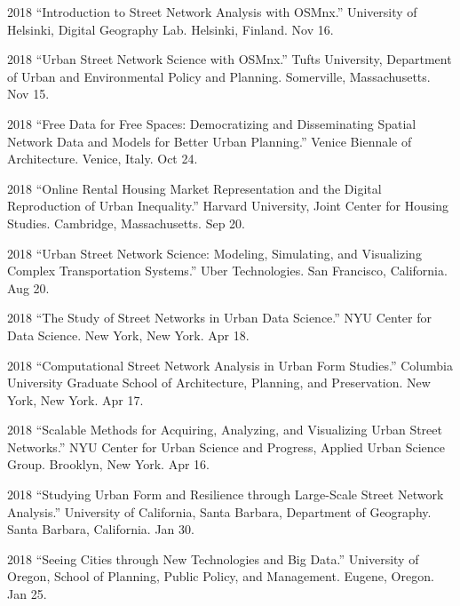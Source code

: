 \documentclass[11pt,letterpaper]{report}
\begin{document}
\begin{tablist}
        \item[2018] \tab{}\enquote{Introduction to Street Network Analysis with OSMnx.} University of Helsinki, Digital Geography Lab. Helsinki, Finland. Nov 16.

        \item[2018] \tab{}\enquote{Urban Street Network Science with OSMnx.} Tufts University, Department of Urban and Environmental Policy and Planning. Somerville, Massachusetts. Nov 15.

        \item[2018] \tab{}\enquote{Free Data for Free Spaces: Democratizing and Disseminating Spatial Network Data and Models for Better Urban Planning.} Venice Biennale of Architecture. Venice, Italy. Oct 24.

        \item[2018] \tab{}\enquote{Online Rental Housing Market Representation and the Digital Reproduction of Urban Inequality.} Harvard University, Joint Center for Housing Studies. Cambridge, Massachusetts. Sep 20.

        \item[2018] \tab{}\enquote{Urban Street Network Science: Modeling, Simulating, and Visualizing Complex Transportation Systems.} Uber Technologies. San Francisco, California. Aug 20.

        \item[2018] \tab{}\enquote{The Study of Street Networks in Urban Data Science.} NYU Center for Data Science. New York, New York. Apr 18.

        \item[2018] \tab{}\enquote{Computational Street Network Analysis in Urban Form Studies.} Columbia University Graduate School of Architecture, Planning, and Preservation. New York, New York. Apr 17.

        \item[2018] \tab{}\enquote{Scalable Methods for Acquiring, Analyzing, and Visualizing Urban Street Networks.} NYU Center for Urban Science and Progress, Applied Urban Science Group. Brooklyn, New York. Apr 16.

        \item[2018] \tab{}\enquote{Studying Urban Form and Resilience through Large-Scale Street Network Analysis.} University of California, Santa Barbara, Department of Geography. Santa Barbara, California. Jan 30.

        \item[2018] \tab{}\enquote{Seeing Cities through New Technologies and Big Data.} University of Oregon, School of Planning, Public Policy, and Management. Eugene, Oregon. Jan 25.


\end{tablist}
\end{document}
